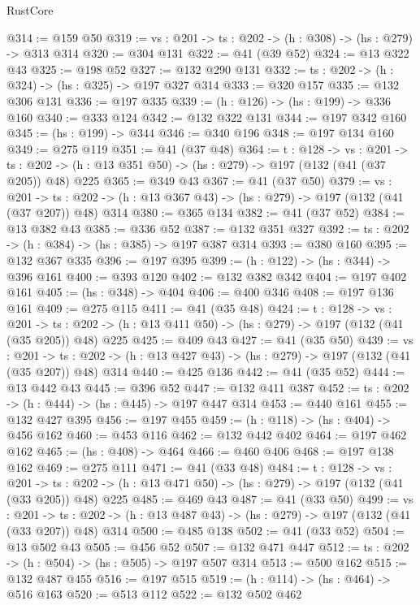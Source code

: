 \begin{lexlean}{RustCore}
\begin{coremodule}
@314 := @159 @50
@319 := {vs : @201} -> {ts : @202} -> (h : @308) -> (hs : @279) -> @313 @314
@320 := @304 @131
@322 := @41 (@39 @52)
@324 := @13 @322 @43
@325 := @198 @52
@327 := @132 @290 @131
@332 := {ts : @202} -> (h : @324) -> (hs : @325) -> @197 @327 @314
@333 := @320 @157
@335 := @132 @306 @131
@336 := @197 @335
@339 := (h : @126) -> (hs : @199) -> @336 @160
@340 := @333 @124
@342 := @132 @322 @131
@344 := @197 @342 @160
@345 := (hs : @199) -> @344
@346 := @340 @196
@348 := @197 @134 @160
@349 := @275 @119
@351 := @41 (@37 @48)
@364 := {t : @128} ->
  {vs : @201} ->
  {ts : @202} -> (h : @13 @351 @50) -> (hs : @279) -> @197 (@132 (@41 (@37 @205)) @48) @225
@365 := @349 @43
@367 := @41 (@37 @50)
@379 := {vs : @201} ->
  {ts : @202} -> (h : @13 @367 @43) -> (hs : @279) -> @197 (@132 (@41 (@37 @207)) @48) @314
@380 := @365 @134
@382 := @41 (@37 @52)
@384 := @13 @382 @43
@385 := @336 @52
@387 := @132 @351 @327
@392 := {ts : @202} -> (h : @384) -> (hs : @385) -> @197 @387 @314
@393 := @380 @160
@395 := @132 @367 @335
@396 := @197 @395
@399 := (h : @122) -> (hs : @344) -> @396 @161
@400 := @393 @120
@402 := @132 @382 @342
@404 := @197 @402 @161
@405 := (hs : @348) -> @404
@406 := @400 @346
@408 := @197 @136 @161
@409 := @275 @115
@411 := @41 (@35 @48)
@424 := {t : @128} ->
  {vs : @201} ->
  {ts : @202} -> (h : @13 @411 @50) -> (hs : @279) -> @197 (@132 (@41 (@35 @205)) @48) @225
@425 := @409 @43
@427 := @41 (@35 @50)
@439 := {vs : @201} ->
  {ts : @202} -> (h : @13 @427 @43) -> (hs : @279) -> @197 (@132 (@41 (@35 @207)) @48) @314
@440 := @425 @136
@442 := @41 (@35 @52)
@444 := @13 @442 @43
@445 := @396 @52
@447 := @132 @411 @387
@452 := {ts : @202} -> (h : @444) -> (hs : @445) -> @197 @447 @314
@453 := @440 @161
@455 := @132 @427 @395
@456 := @197 @455
@459 := (h : @118) -> (hs : @404) -> @456 @162
@460 := @453 @116
@462 := @132 @442 @402
@464 := @197 @462 @162
@465 := (hs : @408) -> @464
@466 := @460 @406
@468 := @197 @138 @162
@469 := @275 @111
@471 := @41 (@33 @48)
@484 := {t : @128} ->
  {vs : @201} ->
  {ts : @202} -> (h : @13 @471 @50) -> (hs : @279) -> @197 (@132 (@41 (@33 @205)) @48) @225
@485 := @469 @43
@487 := @41 (@33 @50)
@499 := {vs : @201} ->
  {ts : @202} -> (h : @13 @487 @43) -> (hs : @279) -> @197 (@132 (@41 (@33 @207)) @48) @314
@500 := @485 @138
@502 := @41 (@33 @52)
@504 := @13 @502 @43
@505 := @456 @52
@507 := @132 @471 @447
@512 := {ts : @202} -> (h : @504) -> (hs : @505) -> @197 @507 @314
@513 := @500 @162
@515 := @132 @487 @455
@516 := @197 @515
@519 := (h : @114) -> (hs : @464) -> @516 @163
@520 := @513 @112
@522 := @132 @502 @462

\end{coremodule}
\end{lexlean}
